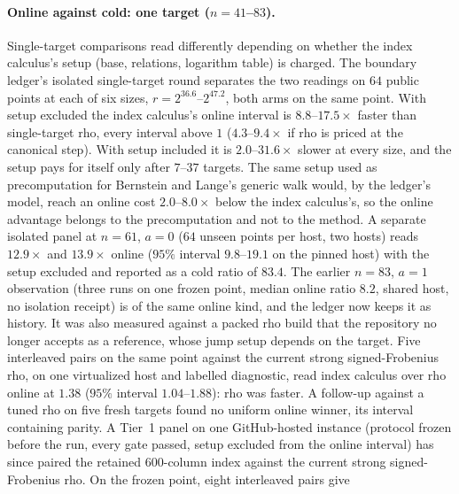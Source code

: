 \paragraph{Online against cold: one target ($n=41$--$83$).}
Single-target comparisons read differently depending on whether the
index calculus's setup (base, relations, logarithm table) is charged.
The boundary ledger's isolated single-target round separates the two
readings on $64$ public points at each of six sizes,
$r=2^{36.6}$--$2^{47.2}$, both arms on the same
point.
With setup excluded the index calculus's online interval is
$8.8$--$17.5\times$ faster than single-target rho, every interval
above $1$ ($4.3$--$9.4\times$ if rho is priced at the canonical
step). With setup included it is $2.0$--$31.6\times$ slower at every
size, and the setup pays for itself only after $7$--$37$ targets. The
same setup used as precomputation for Bernstein and Lange's generic
walk would, by the ledger's model, reach an online cost $2.0$--$8.0\times$
below the index calculus's, so the online advantage belongs to the
precomputation and not to the method. A separate isolated panel at
$n=61$, $a=0$ ($64$ unseen points per host, two hosts) reads
$12.9\times$ and $13.9\times$ online ($95\%$ interval $9.8$--$19.1$ on
the pinned host) with the setup excluded and reported as a cold ratio
of $83.4$. The
earlier $n=83$, $a=1$ observation (three runs on one frozen point,
median online ratio $8.2$, shared host, no isolation receipt) is of
the same online kind, and the ledger now keeps it as
history.
It was also measured against a packed rho build that the repository no
longer accepts as a reference, whose jump setup depends on the target.
Five interleaved pairs on the same point against the current strong
signed-Frobenius rho, on one virtualized host and labelled diagnostic,
read index calculus over rho online at $1.38$ ($95\%$ interval
$1.04$--$1.88$): rho was faster. A follow-up against a tuned rho on
five fresh targets found no uniform online winner, its interval
containing parity.
A Tier~1 panel on one GitHub-hosted instance (protocol frozen before the
run, every gate passed, setup excluded from the online interval) has since
paired the retained $600$-column index against the current strong
signed-Frobenius rho. On the frozen point, eight interleaved pairs give
